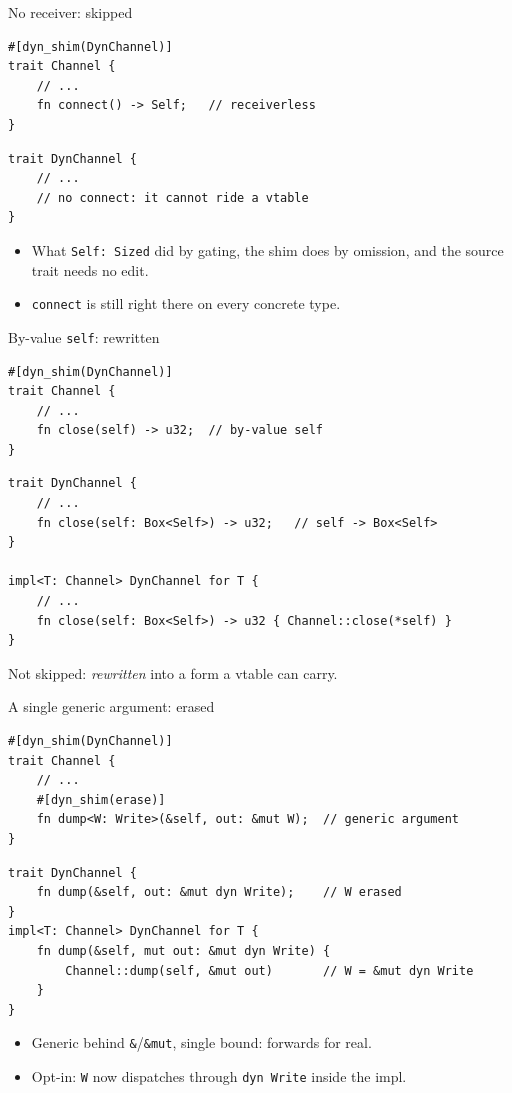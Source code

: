 \documentclass[aspectratio=169]{beamer}
\begin{document}
\begin{frame}[fragile]{No receiver: skipped}
\begin{lstlisting}
#[dyn_shim(DynChannel)]
trait Channel {
    // ...
    fn connect() -> Self;   // receiverless
}
\end{lstlisting}
\pause
\begin{lstlisting}
trait DynChannel {
    // ...
    // no connect: it cannot ride a vtable
}
\end{lstlisting}
  \begin{itemize}
    \item What \texttt{Self: Sized} did by gating, the shim does by omission,
          and the source trait needs no edit.
    \item \texttt{connect} is still right there on every concrete type.
  \end{itemize}
\end{frame}

\begin{frame}[fragile]{By-value \texttt{self}: rewritten}
\begin{lstlisting}
#[dyn_shim(DynChannel)]
trait Channel {
    // ...
    fn close(self) -> u32;  // by-value self
}
\end{lstlisting}
\pause
\begin{lstlisting}
trait DynChannel {
    // ...
    fn close(self: Box<Self>) -> u32;   // self -> Box<Self>
}

impl<T: Channel> DynChannel for T {
    // ...
    fn close(self: Box<Self>) -> u32 { Channel::close(*self) }
}
\end{lstlisting}
  Not skipped: \emph{rewritten} into a form a vtable can carry.
\end{frame}

\begin{frame}[fragile]{A single generic argument: erased}
\begin{lstlisting}
#[dyn_shim(DynChannel)]
trait Channel {
    // ...
    #[dyn_shim(erase)]
    fn dump<W: Write>(&self, out: &mut W);  // generic argument
}
\end{lstlisting}
\pause
\begin{lstlisting}
trait DynChannel {
    fn dump(&self, out: &mut dyn Write);    // W erased
}
impl<T: Channel> DynChannel for T {
    fn dump(&self, mut out: &mut dyn Write) {
        Channel::dump(self, &mut out)       // W = &mut dyn Write
    }
}
\end{lstlisting}
  \begin{itemize}
    \item Generic behind \texttt{\&}/\texttt{\&mut}, single bound: forwards
          for real.
    \item Opt-in: \texttt{W} now dispatches through \texttt{dyn Write} inside
          the impl.
  \end{itemize}
\end{frame}
\end{document}
